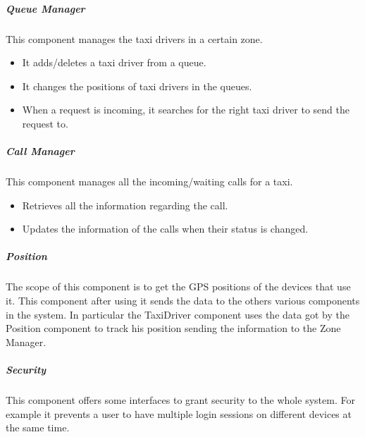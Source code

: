 \subparagraph{Queue Manager}
This component manages the taxi drivers in a certain zone.
\begin{itemize}
    \item It adds/deletes a taxi driver from a queue.
    \item It changes the positions of taxi drivers in the queues.
    \item When a request is incoming, it searches for the right taxi driver to send the request to.
\end{itemize}

\subparagraph{Call Manager}
This component manages all the incoming/waiting calls for a taxi.
\begin{itemize}
    \item Retrieves all the information regarding the call.
    \item Updates the information of the calls when their status is changed.
\end{itemize}

\subparagraph{Position}
The scope of this component is to get the GPS positions of the devices that use it. This component after using it sends the data to the others various components in the system. In particular the TaxiDriver component uses the data got by the Position component to track his position sending the information to the Zone Manager.

\subparagraph{Security}
This component offers some interfaces to grant security to the whole system.
For example  it prevents a user to have multiple login sessions on different devices at the same time.
